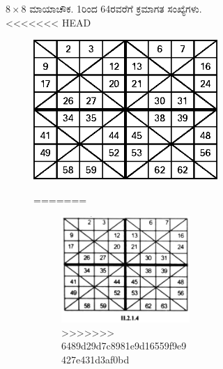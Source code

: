 \begin{figure}[H]
\begin{figure}[H]
$8 \times 8$ ಮಾಯಾಚೌಕ. 1ರಿಂದ 64ರವರೆಗೆ ಕ್ರಮಾಗತ ಸಂಖ್ಯೆಗಳು.
<<<<<<< HEAD
\begin{figure}[h]
\includegraphics{src/figures/chap3/fig3-17.eps}\\
\caption*{II.2.1.4}
=======
\begin{figure}[!h]
\includegraphics{src/figures/chap3/fig3.17.jpg}
>>>>>>> 6489d29d7c8981e9d16559f9e9427e431d3af0bd
\end{figure}
\begin{figure}[h]

\end{figure}
\end{figure}
\end{figure}
\end{figure}
